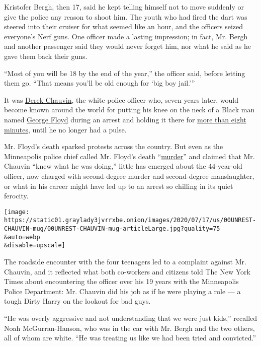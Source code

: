 Kristofer Bergh, then 17, said he kept telling himself not to move
suddenly or give the police any reason to shoot him. The youth who had
fired the dart was steered into their cruiser for what seemed like an
hour, and the officers seized everyone's Nerf guns. One officer made a
lasting impression; in fact, Mr. Bergh and another passenger said they
would never forget him, nor what he said as he gave them back their
guns.

``Most of you will be 18 by the end of the year,'' the officer said,
before letting them go. ``That means you'll be old enough for `big boy
jail.'''

It was
\href{https://www.nytimes3xbfgragh.onion/2020/07/22/us/derek-chauvin-tax-fraud.html}{Derek
Chauvin}, the white police officer who, seven years later, would become
known around the world for putting his knee on the neck of a Black man
named
\href{https://www.nytimes3xbfgragh.onion/2020/08/11/us/politics/democrats-voter-registration-george-floyd.html}{George
Floyd} during an arrest and holding it there for
\href{https://www.nytimes3xbfgragh.onion/2020/05/31/us/george-floyd-investigation.html}{more
than eight minutes}, until he no longer had a pulse.

Mr. Floyd's death sparked protests across the country. But even as the
Minneapolis police chief called Mr. Floyd's death
``\href{https://www.cnn.com/2020/06/24/us/minneapolis-police-chief-comment-george-floyd-trnd/index.html}{murder}''
and claimed that Mr. Chauvin ``knew what he was doing,'' little has
emerged about the 44-year-old officer, now charged with second-degree
murder and second-degree manslaughter, or what in his career might have
led up to an arrest so chilling in its quiet ferocity.

\texttt{[image: https://static01.graylady3jvrrxbe.onion/images/2020/07/17/us/00UNREST-CHAUVIN-mug/00UNREST-CHAUVIN-mug-articleLarge.jpg?quality=75\\\&auto=webp\\\&disable=upscale]}

The roadside encounter with the four teenagers led to a complaint
against Mr. Chauvin, and it reflected what both co-workers and citizens
told The New York Times about encountering the officer over his 19 years
with the Minneapolis Police Department: Mr. Chauvin did his job as if he
were playing a role --- a tough Dirty Harry on the lookout for bad guys.

``He was overly aggressive and not understanding that we were just
kids,'' recalled Noah McGurran-Hanson, who was in the car with Mr. Bergh
and the two others, all of whom are white. ``He was treating us like we
had been tried and convicted.''


